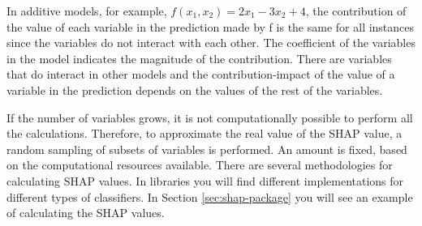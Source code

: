 In additive models, for example, $f(x_1, x_2) = 2x_1 -3x_2 + 4$, the contribution of the value of each variable in the prediction made by f is the same for all instances since the variables do not interact with each other. The coefficient of the variables in the model indicates the magnitude of the contribution. There are variables that do interact in other models and the contribution-impact of the value of a variable in the prediction depends on the values of the rest of the variables.

If the number of variables grows, it is not computationally possible to perform all the calculations. Therefore, to approximate the real value of the SHAP value, a random sampling of subsets of variables is performed. An amount is fixed, based on the computational resources available. There are several methodologies for calculating SHAP values. In libraries you will find different implementations for different types of classifiers. In Section \ref{sec:shap-package} you will see an example of calculating the SHAP values.